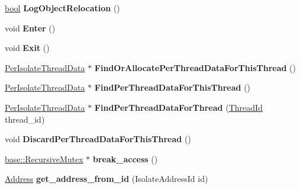 \begin{DoxyCompactItemize}
\mbox{\hyperlink{classbool}{bool}} {\bfseries Log\+Object\+Relocation} ()
\item 
\mbox{\label{classv8_1_1internal_1_1Isolate_adf00545d4013e63407469f2150cdf3ae}} 
void {\bfseries Enter} ()
\item 
\mbox{\label{classv8_1_1internal_1_1Isolate_af1aa4087b9ee9f478f8b948708e781d2}} 
void {\bfseries Exit} ()
\item 
\mbox{\label{classv8_1_1internal_1_1Isolate_a9529aee078466211c6f7582405c9247a}} 
\mbox{\hyperlink{classv8_1_1internal_1_1Isolate_1_1PerIsolateThreadData}{Per\+Isolate\+Thread\+Data}} $\ast$ {\bfseries Find\+Or\+Allocate\+Per\+Thread\+Data\+For\+This\+Thread} ()
\item 
\mbox{\label{classv8_1_1internal_1_1Isolate_a67b9b549f88af4e2e59ccd65694a9c3b}} 
\mbox{\hyperlink{classv8_1_1internal_1_1Isolate_1_1PerIsolateThreadData}{Per\+Isolate\+Thread\+Data}} $\ast$ {\bfseries Find\+Per\+Thread\+Data\+For\+This\+Thread} ()
\item 
\mbox{\label{classv8_1_1internal_1_1Isolate_a0038635b49c04ad3f746c0d6d149da4a}} 
\mbox{\hyperlink{classv8_1_1internal_1_1Isolate_1_1PerIsolateThreadData}{Per\+Isolate\+Thread\+Data}} $\ast$ {\bfseries Find\+Per\+Thread\+Data\+For\+Thread} (\mbox{\hyperlink{classv8_1_1internal_1_1ThreadId}{Thread\+Id}} thread\+\_\+id)
\item 
\mbox{\label{classv8_1_1internal_1_1Isolate_a3b74560062c982b9ebfc17fcc2e0324a}} 
void {\bfseries Discard\+Per\+Thread\+Data\+For\+This\+Thread} ()
\item 
\mbox{\label{classv8_1_1internal_1_1Isolate_aee63083185199159f3950d326c6ddffe}} 
\mbox{\hyperlink{classv8_1_1base_1_1RecursiveMutex}{base\+::\+Recursive\+Mutex}} $\ast$ {\bfseries break\+\_\+access} ()
\item 
\mbox{\label{classv8_1_1internal_1_1Isolate_a5f23e27ded403de49448377f81d1de30}} 
\mbox{\hyperlink{classuintptr__t}{Address}} {\bfseries get\+\_\+address\+\_\+from\+\_\+id} (Isolate\+Address\+Id id)

\end{DoxyCompactItemize}
